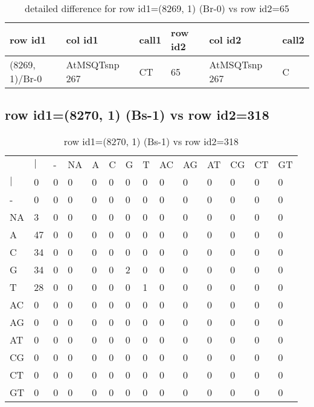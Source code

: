 \begin{center}
\begin{longtable}{|l|l|l|l|l|l|}
\caption{detailed difference for row id1=(8269, 1) (Br-0) vs row id2=65} \label{table_dm417}\\
\hline
row id1&col id1&call1&row id2&col id2&call2\\
\hline
(8269, 1)/Br-0&AtMSQTsnp 267&CT&65&AtMSQTsnp 267&C\\
\hline
\end{longtable}
\end{center}

\subsection{row id1=(8270, 1) (Bs-1) vs row id2=318}
\begin{center}
\begin{longtable}{|l|l|l|l|l|l|l|l|l|l|l|l|l|l|}
\caption{row id1=(8270, 1) (Bs-1) vs row id2=318} \label{table_dm418}\\
\hline
\\
\hline
&$|$&-&NA&A&C&G&T&AC&AG&AT&CG&CT&GT\\
$|$&0&0&0&0&0&0&0&0&0&0&0&0&0\\
-&0&0&0&0&0&0&0&0&0&0&0&0&0\\
NA&3&0&0&0&0&0&0&0&0&0&0&0&0\\
A&47&0&0&0&0&0&0&0&0&0&0&0&0\\
C&34&0&0&0&0&0&0&0&0&0&0&0&0\\
G&34&0&0&0&0&2&0&0&0&0&0&0&0\\
T&28&0&0&0&0&0&1&0&0&0&0&0&0\\
AC&0&0&0&0&0&0&0&0&0&0&0&0&0\\
AG&0&0&0&0&0&0&0&0&0&0&0&0&0\\
AT&0&0&0&0&0&0&0&0&0&0&0&0&0\\
CG&0&0&0&0&0&0&0&0&0&0&0&0&0\\
CT&0&0&0&0&0&0&0&0&0&0&0&0&0\\
GT&0&0&0&0&0&0&0&0&0&0&0&0&0\\
\hline
\end{longtable}
\end{center}

